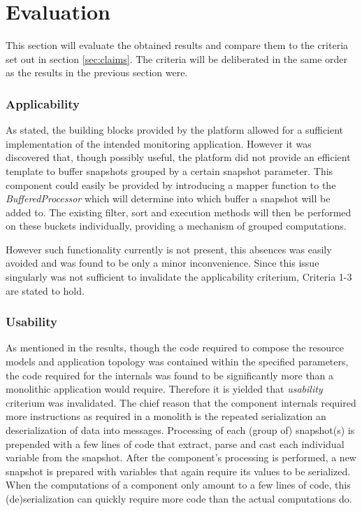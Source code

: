 \section{Evaluation}
\label{sec:eval}
This section will evaluate the obtained results and compare them to the criteria set out in section \ref{sec:claims}. The criteria will be deliberated in the same order as the results in the previous section were.

\subsubsection{Applicability}
As stated, the building blocks provided by the platform allowed for a sufficient implementation of the intended monitoring application. However it was discovered that, though possibly useful, the platform did not provide an efficient template to buffer snapshots grouped by a certain snapshot parameter.  This component could easily be provided by introducing a mapper function to the \emph{BufferedProcessor} which will determine into which buffer a snapshot will be added to. The existing filter, sort and execution methods will then be performed on these buckets individually, providing a mechanism of grouped computations.

However such functionality currently is not present, this absences was easily avoided and was found to be only a minor inconvenience. Since this issue singularly was not sufficient to invalidate the applicability criterium, Criteria 1-3 are stated to hold.


\subsubsection{Usability}
As mentioned in the results, though the code required to compose the resource models and application topology was contained within the specified parameters, the code required for the internals was found to be significantly more than a monolithic application would require. Therefore it is yielded that \emph{usability} criterium was invalidated. The chief reason that the component internals required  more instructions as required in a monolith is the repeated serialization an deserialization of data into messages. Processing of each (group of) snapshot(s) is prepended with a few lines of code that extract, parse and cast each individual variable from the snapshot. After the component's processing is performed, a new snapshot is prepared with variables that again require its values to be serialized. When the computations of a component only amount to a few lines of code, this (de)serialization can quickly require more code than the actual computations do.

